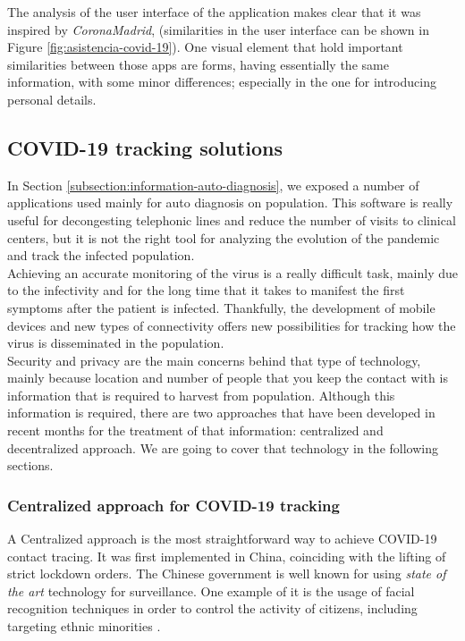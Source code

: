 \documentclass[a4paper, 12pt]{article}
\begin{document}
The analysis of the user interface of the application makes clear that it was inspired by \textit{CoronaMadrid}, (similarities in the user interface can be shown in Figure \ref{fig:asistencia-covid-19}). One visual element that hold important similarities between those apps are forms, having essentially the same information, with some minor differences; especially in the one for introducing personal details.

\subsection{COVID-19 tracking solutions}
\label{subsection:covid-19-tracking}

In Section \ref{subsection:information-auto-diagnosis}, we exposed a number of applications used mainly for auto diagnosis on population. This software is really useful for decongesting telephonic lines and reduce the number of visits to clinical centers, but it is not the right tool for analyzing the evolution of the pandemic and track the infected population.\\

Achieving an accurate monitoring of the virus is a really difficult task, mainly due to the infectivity and for the long time that it takes to manifest the first symptoms after the patient is infected. Thankfully, the development of mobile devices and new types of connectivity offers new possibilities for tracking how the virus is disseminated in the population. \\

Security and privacy are the main concerns behind that type of technology, mainly because location and number of people that you keep the contact with is information that is required to harvest from population. Although this information is required, there are two approaches that have been developed in recent months for the treatment of that information: centralized and decentralized approach. We are going to cover that technology in the following sections. \\

\subsubsection{Centralized approach for COVID-19 tracking}
\label{subsubsection:centralized-approach}

A Centralized approach is the most straightforward way to achieve COVID-19 contact tracing. It was first implemented in China, coinciding with the lifting of strict lockdown orders. The Chinese government is well known for using \textit{state of the art} technology for surveillance. One example of it is the usage of facial recognition techniques in order to control the activity of citizens, including targeting ethnic minorities \cite{china-massive-covid-tracking}. \\
\end{document}

